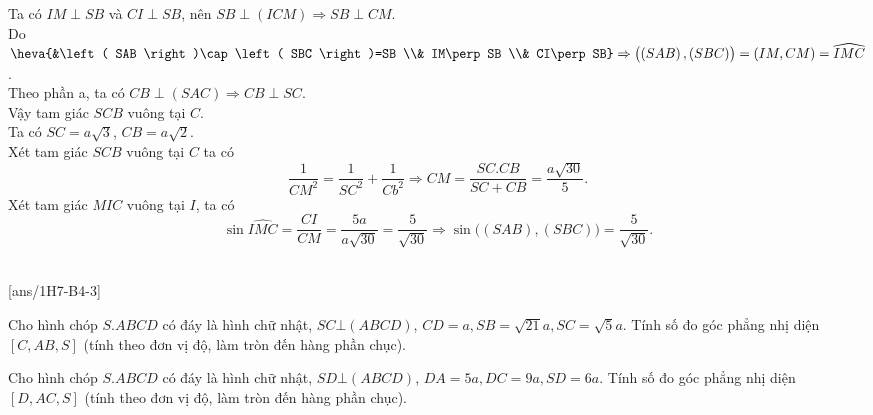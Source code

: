 \begin{ex}
{\begin{itemchoice}
			Ta có $IM\perp SB$ và $CI\perp SB$, nên $SB\perp \left( ICM \right)\Rightarrow SB\perp CM.$\\
			Do $\heva{&\left( SAB \right)\cap \left( SBC \right)=SB \\&
				IM\perp SB \\&
				CI\perp SB} \Rightarrow \bigl( \left( SAB \right),\left( SBC \right) \bigr)=\left( IM,CM \right)=\widehat{IMC}$.\\
			Theo phần a, ta có $CB\perp \left( SAC \right)\Rightarrow CB\perp SC$.\\
			Vậy tam giác $SCB$ vuông tại $C$.\\
			Ta có $SC=a\sqrt 3$, $CB=a\sqrt 2$.\\
			Xét tam giác $SCB$ vuông tại $C$ ta có
			$$\dfrac 1{CM^2}=\dfrac 1{SC^2}+\dfrac 1{Cb^2}\Rightarrow CM=\dfrac{SC.CB}{SC+CB}=\dfrac{a\sqrt{30}} 5.$$
			Xét tam giác $MIC$ vuông tại $I$, ta có
			$$\sin\widehat{IMC}=\dfrac{CI}{CM}=\dfrac{5a}{a\sqrt{30}}=\dfrac 5{\sqrt{30}}\Rightarrow \sin \bigl( \left( SAB \right),\left( SBC \right) \bigr)=\dfrac 5{\sqrt{30}}.$$
		\end{itemchoice}
	}
\end{ex}

 \\
[ans/1H7-B4-3]

\begin{ex}
	Cho hình chóp ${S.ABCD}$ có đáy là hình chữ nhật, $SC\bot (ABCD)$, $CD=a, SB=\sqrt{21} a, SC=\sqrt{5} a$. Tính số đo góc phẳng nhị diện ${[C,AB,S]}$ (tính theo đơn vị độ, làm tròn đến hàng phần chục).\\
	\end{ex}

\begin{ex}
	Cho hình chóp ${S.ABCD}$ có đáy là hình chữ nhật, $SD\bot (ABCD)$, $DA=5 a, DC=9 a, SD=6 a$. Tính số đo góc phẳng nhị diện ${[D,AC,S]}$ (tính theo đơn vị độ, làm tròn đến hàng phần chục).\\
	\end{ex}

